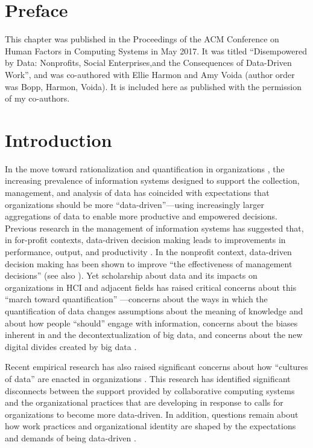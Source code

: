 \section{Preface}
This chapter was published in the Proceedings of the ACM Conference on Human Factors in Computing Systems in May 2017. It was titled ``Disempowered by Data:  Nonprofits, Social Enterprises,and the Consequences of Data-Driven Work'', and was co-authored with Ellie Harmon and Amy Voida (author order was Bopp, Harmon, Voida). It is included here as published with the permission of my co-authors.

\section{Introduction}
In the move toward rationalization and quantification in organizations \citep{Morgan1997Images}, the increasing prevalence of information systems designed to support the collection, management, and analysis of data has coincided with expectations that organizations should be more “data-driven”---using increasingly larger aggregations of data to enable more productive and empowered decisions. Previous research in the management of information systems has suggested that, in for-profit contexts, data-driven decision making leads to improvements in performance, output, and productivity \citep{Brynjolfsson2011Strength,Lavalle2011Big}. In the nonprofit context, data-driven decision making has been shown to improve “the effectiveness of management decisions” \citep{Maxwell2016Data} (see also \citep{Leroux2010Does}). Yet scholarship about data and its impacts on organizations in HCI and adjacent fields has raised critical concerns about this “march toward quantification” \citep{Lohr2012Age}---concerns about the ways in which the quantification of data changes assumptions about the meaning of knowledge and about how people “should” engage with information, concerns about the biases inherent in and the decontextualization of big data, and concerns about the new digital divides created by big data \citep{Boyd2012Critical,Pine2015Emerging,Punathambekar2015Debating}.

Recent empirical research has also raised significant concerns about how “cultures of data” are enacted in organizations \citep{Verma2016DrillDown}. This research has identified significant disconnects between the support provided by collaborative computing systems and the organizational practices that are developing in response to calls for organizations to become more data-driven. In addition, questions remain about how work practices and organizational identity are shaped by the expectations and demands of being data-driven \citep{Pine2015Emerging,Power1997Audit,Pentland2000Auditors}.

